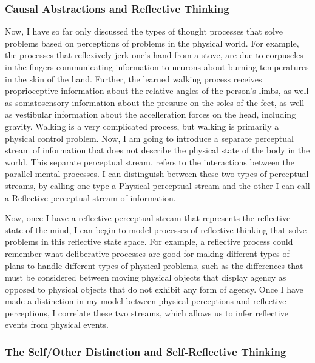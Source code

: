 \subsubsection{Causal Abstractions and Reflective Thinking}

Now, I have so far only discussed the types of thought processes that
solve problems based on perceptions of problems in the physical
world. For example, the processes that reflexively jerk one's hand
from a stove, are due to corpuscles in the fingers communicating
information to neurons about burning temperatures in the skin of the
hand. Further, the learned walking process receives proprioceptive
information about the relative angles of the person's limbs, as well
as somatosensory information about the pressure on the soles of the
feet, as well as vestibular information about the accelleration forces
on the head, including gravity. Walking is a very complicated process,
but walking is primarily a physical control problem. Now, I am going
to introduce a separate perceptual stream of information that does not
describe the physical state of the body in the world. This separate
perceptual stream, refers to the interactions between the parallel
mental processes. I can distinguish between these two types of
perceptual streams, by calling one type a Physical perceptual stream
and the other I can call a Reflective perceptual stream of
information.

Now, once I have a reflective perceptual stream that represents the
reflective state of the mind, I can begin to model processes of
reflective thinking that solve problems in this reflective state
space. For example, a reflective process could remember what
deliberative processes are good for making different types of plans to
handle different types of physical problems, such as the differences
that must be considered between moving physical objects that display
agency as opposed to physical objects that do not exhibit any form of
agency. Once I have made a distinction in my model between physical
perceptions and reflective perceptions, I correlate these two streams,
which allows us to infer reflective events from physical
events.

\subsubsection{The Self/Other Distinction and Self-Reflective Thinking}

